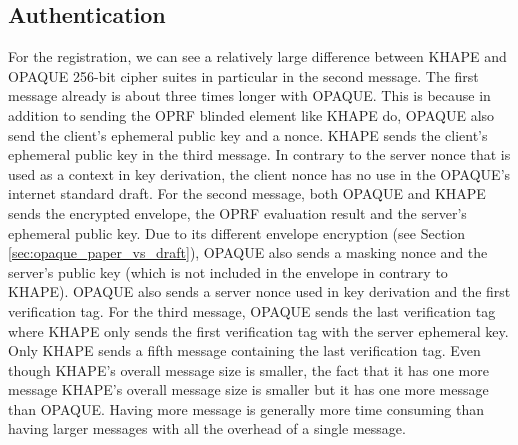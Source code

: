 \documentclass[../report.tex]{subfiles}
\begin{document}


\subsection*{Authentication}
For the registration, we can see a relatively large difference between KHAPE and OPAQUE 256-bit cipher suites in particular in the second message.
The first message already is about three times longer with OPAQUE. This is because in addition to sending the OPRF blinded element like KHAPE do, OPAQUE also send the client's ephemeral public key and a nonce. KHAPE sends the client's ephemeral public key in the third message.
In contrary to the server nonce that is used as a context in key derivation, the client nonce has no use in the OPAQUE's internet standard draft.
For the second message, both OPAQUE and KHAPE sends the encrypted envelope, the OPRF evaluation result and the server's ephemeral public key.
Due to its different envelope encryption (see Section \ref{sec:opaque_paper_vs_draft}), OPAQUE also sends a masking nonce and the server's public key (which is not included in the envelope in contrary to KHAPE).
OPAQUE also sends a server nonce used in key derivation and the first verification tag.
For the third message, OPAQUE sends the last verification tag where KHAPE only sends the first verification tag with the server ephemeral key.
Only KHAPE sends a fifth message containing the last verification tag.
Even though KHAPE's overall message size is smaller, the fact that it has one more message 
KHAPE's overall message size is smaller but it has one more message than OPAQUE. Having more message is generally more time consuming than having larger messages with all the overhead of a single message.
\end{document}
